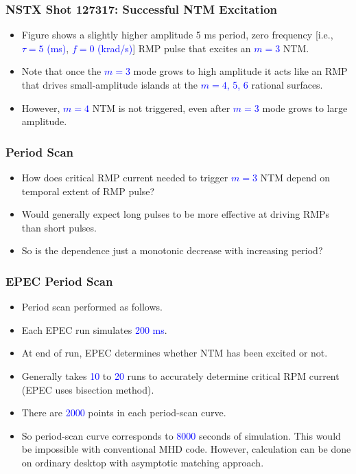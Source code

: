 \documentclass{beamer}
\newcommand{\blue}[1]{\textcolor{blue}{#1}}
\begin{document}
\begin{frame}
\frametitle{NSTX Shot 127317: Successful NTM Excitation}
\begin{itemize}
\item Figure shows a slightly higher amplitude 5 ms period, zero frequency [i.e., \blue{$\tau=5$ (ms)}, \blue{$f= 0$ (krad/s)}] RMP
pulse that  excites an \blue{$m=3$} NTM. 
\item Note that once the \blue{$m=3$} mode grows to high amplitude it acts like an RMP that drives small-amplitude
islands at the \blue{$m=4$, 5, 6} rational surfaces.
\item However, \blue{$m=4$} NTM is not triggered, even after \blue{$m=3$} mode grows to large amplitude. 
\end{itemize}
\end{frame}

\begin{frame}
\frametitle{Period Scan}
\begin{itemize}
\item How does critical RMP current needed to trigger \blue{$m=3$} NTM depend on temporal extent of
RMP pulse? 
\item Would generally expect long pulses to be more effective at driving RMPs than short pulses.
\item So is the dependence just a monotonic decrease with increasing period?
\end{itemize}
\end{frame}

\begin{frame}
\frametitle{EPEC Period Scan}
\begin{itemize}
\item Period scan performed as follows. 
\item Each EPEC run simulates \blue{200 ms}. 
\item At end of run, EPEC determines whether NTM
has been excited or not. 
\item Generally takes \blue{10} to \blue{20} runs to accurately determine critical RPM current (EPEC uses
bisection method). 
\item There are \blue{2000} points in each period-scan curve. 
\item So period-scan curve corresponds to \blue{8000} seconds of simulation.  This would be impossible with
conventional MHD code. However, calculation can be done on ordinary desktop with asymptotic matching approach.
\end{itemize}
\end{frame}
\end{document}
